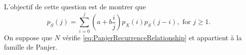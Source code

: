 \documentclass[12pt]{exam}
\begin{document}
\begin{questions}
\question L'objectif de cette question est de montrer que
\begin{equation}\label{eq:PanjerRecursion}
p_{S}(j)=\sum_{i=0}^{j}\left(a+b\frac{i}{j}\right)p_{X}(i)p_S(j-i),\text{ for }j\geq1.
\end{equation}
On suppose que $N$ vérifie \eqref{eq:PanjerRecurrenceRelationship} et appartient à la famille de Panjer.
\end{questions}
\end{document}
